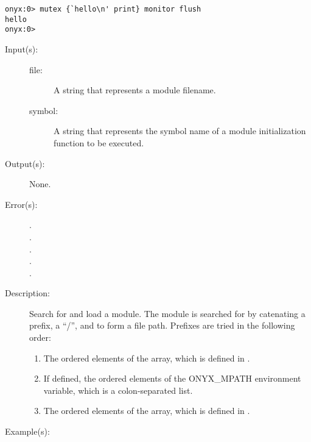\begin{description}
\begin{description}
\begin{verbatim}
onyx:0> mutex {`hello\n' print} monitor flush
hello
onyx:0>
		\end{verbatim}
	\end{description}
\label{systemdict:mrequire}
\item[{\onyxop{file symbol}{mrequire}{--}}: ]
	\begin{description}\item[]
	\item[Input(s): ]
		\begin{description}\item[]
		\item[file: ]
			A string that represents a module filename.
		\item[symbol: ]
			A string that represents the symbol name of a
			module initialization function to be executed.
		\end{description}
	\item[Output(s): ] None.
	\item[Error(s): ]
		\begin{description}\item[]
		\item[.]
		\item[.]
		\item[.]
		\item[.]
		\item[.]
		\end{description}
	\item[Description: ]
		Search for and load a module.  The module is searched for by
		catenating a prefix, a ``/'', and  to form a file
		path.  Prefixes are tried in the following order:
		\begin{enumerate}
			\item{The ordered elements of the
			 array, which is
			defined in .}
			\item{If defined, the ordered elements of the
			ONYX\_MPATH environment variable, which is a
			colon-separated list.}
			\item{The ordered elements of the
			 array, which
			is defined in .}
		\end{enumerate}
	\item[Example(s): ]\begin{verbatim}


\end{verbatim}
\end{description}
\end{description}
